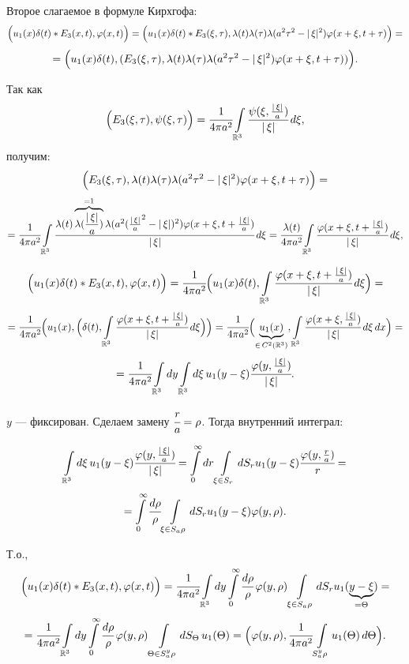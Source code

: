 \documentclass[unicode,12pt,draft]{article}
\begin{document}
Второе слагаемое в формуле Кирхгофа:
$$\Bigl(u_1(x)\delta(t)*E_3(x,t),\varphi(x,t)\Bigr)=
\Bigl(u_1(x)\delta(t)*E_3(\xi,\tau),
\lambda(t)\lambda(\tau)\lambda(a^2\tau^2-|\,\xi|^2)\varphi(x+\xi,t+\tau)\Bigr)=$$
$$=\Bigl(u_1(x)\delta(t),
(E_3(\xi,\tau),\lambda(t)\lambda(\tau)\lambda(a^2\tau^2-|\,\xi|^2)\varphi(x+\xi,t+\tau))\Bigr).$$

Так как $$\Bigl(E_3(\xi,\tau),\psi(\xi,\tau)\Bigr)= \cfrac1{4\pi
a^2}\int\limits_{\mathbb R^3}
\cfrac{\psi(\xi,\frac{|\,\xi|}a)}{|\,\xi|}\,d\xi,$$ получим:
$$\Bigl(E_3(\xi,\tau),\lambda(t)\lambda(\tau)\lambda(a^2\tau^2-|\,\xi|^2)\varphi(x+\xi,t+\tau)\Bigr)=$$
$$=\cfrac1{4\pi a^2}\int\limits_{\mathbb R^3}
\cfrac{\lambda(t)\overbrace{\lambda(\frac{|\,\xi|}a)}^{=1}\lambda(a^2(\frac{|\,\xi|}a^2-|\,\xi|)^2)
\varphi(x+\xi,t+\frac{|\,\xi|}a)}{|\,\xi|}\,d\xi=
\cfrac{\lambda(t)} {4\pi a^2}\int\limits_{\mathbb
R^3}\cfrac{\varphi(x+\xi,t+\frac{|\,\xi|}a)}{|\,\xi|}\,d\xi,$$

$$\Bigl(u_1(x)\delta(t)*E_3(x,t),\varphi(x,t)\Bigr)=
\cfrac1{4\pi a^2}\Bigl(u_1(x)\delta(t),\int\limits_{\mathbb
R^3}\cfrac{\varphi(x+\xi,t+\frac{|\,\xi|}a)}{|\,\xi|}\,d\xi\Bigr)=$$
$$=\cfrac1{4\pi a^2}\Bigl(u_1(x),\Bigl(\delta(t),\int\limits_{\mathbb
R^3}\cfrac{\varphi(x+\xi,t+\frac{|\,\xi|}a)}{|\,\xi|}\,d\xi\Bigr)\Bigr)=
\cfrac1{4\pi a^2}\Bigl(\underbrace{u_1(x)}_{\in \,C^2(\mathbb
R^3)},\int\limits_{\mathbb
R^3}\cfrac{\varphi(x+\xi,\frac{|\,\xi|}a)}{|\,\xi|}\,d\xi\,dx\Bigr)=$$
$$=\cfrac1{4\pi a^2}\int\limits_{\mathbb
R^3}dy\int\limits_{\mathbb R^3}d\xi\,u_1(y-\xi)
\cfrac{\varphi(y,\frac{|\,\xi|}a)}{|\,\xi|}.$$

$y$ --- фиксирован. Сделаем замену $\cfrac ra=\rho$. Тогда
внутренний интеграл:

$$\int\limits_{\mathbb R^3}d\xi\,u_1(y-\xi)
\cfrac{\varphi(y,\frac{|\,\xi|}a)}{|\,\xi|}=
\int\limits_0^{\infty}dr \int\limits_{\xi\in S_r}dS_r u_1(y-\xi)
\cfrac{\varphi(y,\frac{r}a)}{r}=$$
$$=\int\limits_0^{\infty}\cfrac{d\rho}{\rho} \int\limits_{\xi\in S_a\rho}dS_r u_1(y-\xi)
\varphi(y,\rho).$$

Т.о.,
$$\Bigl(u_1(x)\delta(t)*E_3(x,t),\varphi(x,t)\Bigr)=
\cfrac1{4\pi a^2}\int\limits_{\mathbb
R^3}dy\int\limits_0^{\infty}\cfrac{d\rho}{\rho}\,\varphi(y,\rho)
\int\limits_{\xi\in S_a\rho}dS_r
u_1(\underbrace{y-\xi}_{=\Theta})=$$
$$=\cfrac1{4\pi a^2}\int\limits_{\mathbb
R^3}dy\int\limits_0^{\infty}\cfrac{d\rho}{\rho}\,\varphi(y,\rho)
\int\limits_{\Theta\in S^y_a\rho}dS_{\Theta}\,u_1(\Theta)=
\Bigl(\varphi(y,\rho),\cfrac1{4\pi
a^2}\int\limits_{S^y_a\rho}u_1(\Theta)\,d\Theta\Bigr).$$
\end{document}
